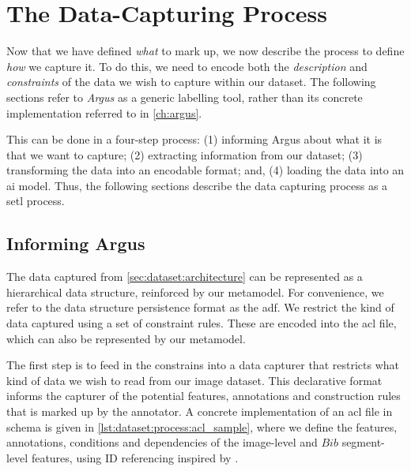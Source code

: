 \section{The Data-Capturing Process}
\label{sec:dataset:process}

Now that we have defined \textit{what} to mark up, we now describe the process to define \textit{how} we capture it. To do this, we need to encode both the \textit{description} and \textit{constraints} of the data we wish to capture within our dataset. The following sections refer to \textit{Argus} as a generic labelling tool, rather than its concrete implementation referred to in \cref{ch:argus}.

This can be done in a four-step process: (1) informing Argus about what it is that we want to capture; (2) extracting information from our dataset; (3) transforming the data into an encodable format; and, (4) loading the data into an \gls{ai} model. Thus, the following sections describe the data capturing process as a \gls{setl} process. 

\subsection{Informing Argus}
\label{sec:dataset:process:informing}

The data captured from \cref{sec:dataset:architecture} can be represented as a hierarchical data structure, reinforced by our metamodel. For convenience, we refer to the data structure persistence format as the \gls{adf}. We restrict the kind of data captured using a set of constraint rules. These are encoded into the \gls{acl} file, which can also be represented by our metamodel.

The first step is to feed in the constrains into a data capturer that restricts what kind of data we wish to read from our image dataset. This declarative format informs the capturer of the potential features, annotations and construction rules that is marked up by the annotator. A concrete implementation of an \gls{acl} file in  schema is given in \cref{lst:dataset:process:acl_sample}, where we define the features, annotations, conditions and dependencies of the image-level and $Bib$ segment-level features, using ID referencing inspired by .

